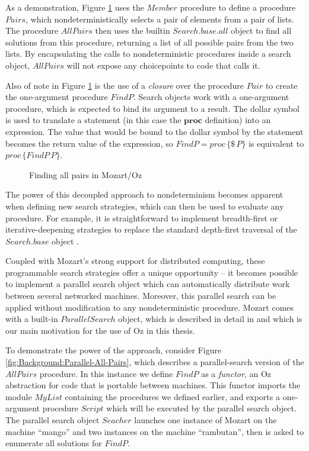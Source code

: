 As a demonstration, Figure \ref{fig:Background:All-Pairs} uses the
$Member$ procedure to define a procedure $Pairs$, which nondeterministically
selects a pair of elements from a pair of lists. The procedure $AllPairs$
then uses the builtin $Search.base.all$ object to find all solutions
from this procedure, returning a list of all possible pairs from the
two lists. By encapsulating the calls to nondeterministic procedures
inside a search object, $AllPairs$ will not expose any choicepoints
to code that calls it.

Also of note in Figure \ref{fig:Background:All-Pairs} is the use
of a \emph{closure} over the procedure $Pair$ to create the one-argument
procedure $FindP$. Search objects work with a one-argument procedure,
which is expected to bind its argument to a result. The dollar symbol
is used to translate a statement (in this case the $\mathbf{proc}$
definition) into an expression. The value that would be bound to the
dollar symbol by the statement becomes the return value of the expression,
so $FindP=proc\,\{\$\, P\}$ is equivalent to $proc\,\{FindP\, P\}$.

%
\begin{figure}[t]

\caption{Finding all pairs in Mozart/Oz\label{fig:Background:All-Pairs}}

\end{figure}


The power of this decoupled approach to nondeterminism becomes apparent
when defining new search strategies, which can then be used to evaluate
any procedure. For example, it is straightforward to implement breadth-first
or iterative-deepening strategies to replace the standard depth-first
traversal of the $Search.base$ object \citep{schulte00constraint_services}.

Coupled with Mozart's strong support for distributed computing, these
programmable search strategies offer a unique opportunity -- it becomes
possible to implement a parallel search object which can automatically
distribute work between several networked machines. Moreover, this
parallel search can be applied without modification to any nondeterministic
procedure. Mozart comes with a built-in $ParallelSearch$ object,
which is described in detail in \citep{schulte00oz_parallel} and
which is our main motivation for the use of Oz in this thesis.

To demonstrate the power of the approach, consider Figure \ref{fig:Background:Parallel-All-Pairs},
which describes a parallel-search version of the $AllPairs$ procedure.
In this instance we define $FindP$ as a \emph{functor}, an Oz
abstraction for code that is portable between machines. This functor
imports the module $MyList$ containing the procedures we defined
earlier, and exports a one-argument procedure $Script$ which will
be executed by the parallel search object. The parallel search object
$Seacher$ launches one instance of Mozart on the machine {}``mango''
and two instances on the machine {}``rambutan'', then is asked to
enumerate all solutions for $FindP$.

